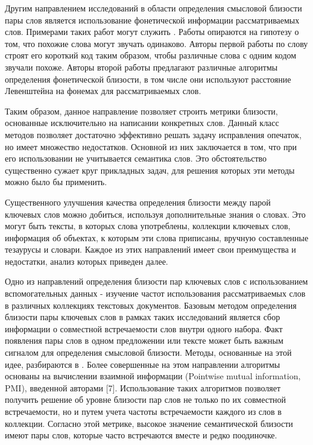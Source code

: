 Другим направлением исследований в области определения смысловой близости пары слов является использование фонетической информации рассматриваемых слов. Примерами таких работ могут служить \cite{soundex,phone_sim}. Работы опираются на гипотезу о том, что похожие слова могут звучать одинаково. Авторы первой работы по слову строят его короткий код таким образом, чтобы различные слова с одним кодом звучали похоже. Авторы второй работы предлагают различные алгоритмы определения фонетической близости, в том числе они используют расстояние Левенштейна на фонемах для рассматриваемых слов.

Таким образом, данное направление позволяет строить метрики близости, основанные исключительно на написании конкретных слов. Данный класс методов позволяет достаточно эффективно решать задачу исправления опечаток, но имеет множество недостатков. Основной из них заключается в том, что при его использовании не учитывается семантика слов. Это обстоятельство существенно сужает круг прикладных задач, для решения которых эти методы можно было бы применить. 

Существенного улучшения качества определения близости между парой ключевых слов можно добиться, используя дополнительные знания о словах. Это могут быть тексты, в которых слова употреблены, коллекции ключевых слов, информация об объектах, к которым эти слова приписаны, вручную составленные тезаурусы и словари. Каждое из этих направлений имеет свои преимущества и недостатки, анализ которых приведен далее.

Одно из направлений определения близости пар ключевых слов с использованием вспомогательных данных - изучение частот использования рассматриваемых слов в различных коллекциях текстовых документов. Базовым методом определения близости пары ключевых слов в рамках таких исследований является сбор информации о совместной встречаемости слов внутри одного набора. Факт появления пары слов в одном предложении или тексте может быть важным сигналом для определения смысловой близости. Методы, основанные на этой идее, разбираются в \cite{freq_1,freq_2,pmi}. Более совершенные на этом направлении алгоритмы основаны на вычислении взаимной информации (Pointwise mutual information, PMI), введенной авторами [7]. Использование таких алгоритмов позволяет получить решение об уровне близости пар слов  не только по их совместной встречаемости, но и путем учета частоты встречаемости каждого из слов в коллекции. Согласно этой метрике, высокое значение семантической близости имеют пары слов, которые часто встречаются вместе и редко поодиночке. 

